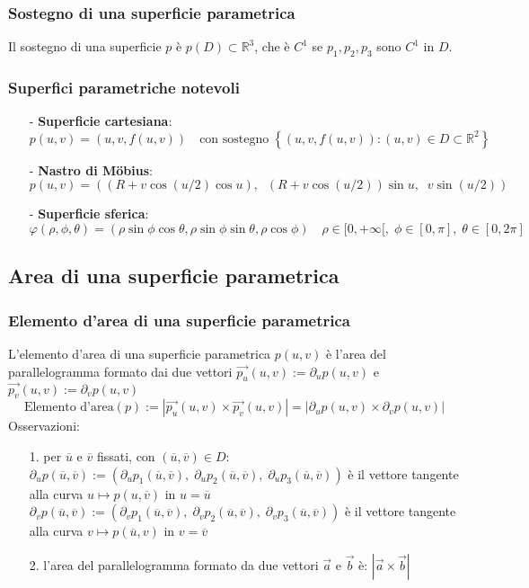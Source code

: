 \documentclass[a4paper]{article}
\newcommand\Rd{\mathbb{R}^2}  %
\newcommand\Rt{\mathbb{R}^3}  %
\begin{document}
\subsubsection*{Sostegno di una superficie parametrica}
Il sostegno di una superficie \(p\) è \(p(D) \subset \Rt\), che è \(C^1\) se \(p_1, p_2, p_3\) sono \(C^1\) in \(D\).

\subsubsection*{Superfici parametriche notevoli}
\begin{itemize}
	\item[-] \textbf{Superficie cartesiana}:
	\[p(u,v) = (u,v,f(u,v)) \quad \text{con sostegno} \; \left\{(u,v,f(u,v)) : (u,v) \in D \subset \Rd\right\}\]
	\item[-] \textbf{Nastro di Möbius}:
	\[p(u,v) = ((R + v \cos (u/2) \cos u), \;\; (R + v \cos (u/2)) \sin u, \;\; v \sin (u/2))\]
	\item[-] \textbf{Superficie sferica}:
	\[\varphi(\rho, \phi, \theta) = (\rho \sin \phi \cos \theta, \rho \sin \phi \sin \theta, \rho \cos \phi) \quad \rho \in [0,+\infty[, \; \phi \in [0, \pi], \; \theta \in [0, 2\pi]\]
\end{itemize}

\subsection{Area di una superficie parametrica}
\subsubsection*{Elemento d'area di una superficie parametrica}
L'elemento d'area di una superficie parametrica \(p(u,v)\) è l'area del parallelogramma formato dai due vettori
\(\vec{p_u}(u,v) := \partial_u p(u,v)\) e \(\vec{p_v}(u,v) := \partial_v p(u,v)\)
\[\text{Elemento d'area}(p) := \left| \vec{p_u}(u,v) \times \vec{p_v}(u,v)\right| = \left| \partial_u p(u,v) \times \partial_v p(u,v) \right|\]
Osservazioni:
\begin{itemize}[topsep=3pt, itemsep=0pt]
	\item[1.] per \(\overline{u}\) e \(\overline{v}\) fissati, con \((\overline{u}, \overline{v}) \in D\): \\
	\(\partial_u p(\overline{u},\overline{v}) := (\partial_u p_1(\overline{u}, \overline{v}), \; \partial_u p_2(\overline{u}, \overline{v}), \; \partial_u p_3(\overline{u}, \overline{v}))\)
	è il vettore tangente alla curva \(u \mapsto p(u,\overline{v})\) in \(u = \overline{u}\) \\
	\(\partial_v p(\overline{u},\overline{v}) := (\partial_v p_1(\overline{u}, \overline{v}), \; \partial_v p_2(\overline{u}, \overline{v}), \; \partial_v p_3(\overline{u}, \overline{v}))\)
	è il vettore tangente alla curva \(v \mapsto p(\overline{u},v)\) in \(v = \overline{v}\)
	\item[2.] l'area del parallelogramma formato da due vettori \(\vec{a}\) e \(\vec{b}\) è: \(\left| \vec{a} \times \vec{b}\right|\)
\end{itemize}
\end{document}
